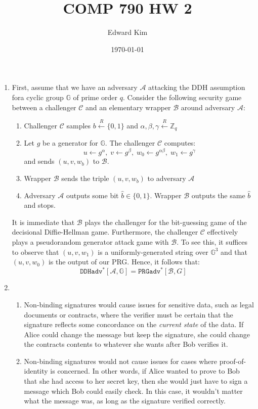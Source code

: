 \documentclass[12pt]{article}%
\newcommand{\chal}{\mathcal{C}}
\newcommand{\A}{\mathcal{A}}
\newcommand{\B}{\mathcal{B}}
\begin{document}
\title{COMP 790 HW 2}
\author{Edward Kim}
\date{\today}
\maketitle

\begin{enumerate}
  \item First, assume that we have an adversary $\A$ attacking the DDH assumption fora
  cyclic group $\mathbb{G}$ of prime order $q$. Consider the following security game between a challenger $\chal$ and an elementary wrapper $\B$ around adversary $\A$:
  \begin{enumerate}
    \item Challenger $\chal$ samples $b \xleftarrow{R} \{0,1\}$ and $\alpha, \beta, \gamma \xleftarrow{R} \mathbb{Z}_q$
    \item Let $g$ be a generator for $\mathbb{G}$. The challenger $\chal$ computes: $$ u \leftarrow g^\alpha, \; v \leftarrow g^\beta , \; w_0 \leftarrow g^{\alpha\beta}, \; w_1 \leftarrow g^\gamma$$
    and sends $(u,v,w_b)$ to $\B$.
    \item Wrapper $\B$ sends the triple $(u,v,w_b)$ to adversary $\A$
    \item Adversary $\A$ outputs some bit $\hat{b} \in \{0,1\}$. Wrapper $\B$ outputs the same $\hat{b}$ and stops.
  \end{enumerate}
  It is immediate that $\B$ plays the challenger for the bit-guessing game of the decisional Diffie-Hellman game. Furthermore, the challenger $\chal$ effectively plays a pseudorandom generator attack game with $\B$. To see this, it suffices to observe that $(u,v,w_1)$ is a uniformly-generated string over $\mathbb{G}^3$ and that $(u,v,w_0)$ is the output of our PRG. Hence, it follows that:
  $$\mathtt{DDHadv}^*[\A, \mathbb{G}] = \mathtt{PRGadv}^*[\B, G]$$
  \item
    \begin{enumerate}
      \item Non-binding signatures would cause issues for sensitive data, such as legal documents or contracts, where the verifier must be certain that the signature reflects some concordance on the \emph{current state} of the data. If Alice could change the message but keep the signature, she could change the contracts contents to whatever she wants after Bob verifies it.
      \item Non-binding signatures would not cause issues for cases where proof-of-identity is concerned. In other words, if Alice wanted to prove to Bob that she had access to her secret key, then she would just have to sign a message which Bob could easily check. In this case, it wouldn't matter what the message was, as long as the signature verified correctly.

\end{enumerate}
\end{enumerate}
\end{document}
